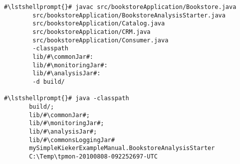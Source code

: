 \begin{lstlisting}[caption=Compile and run under Windows] 			
#\lstshellprompt{}# javac src/bookstoreApplication/Bookstore.java 
        src/bookstoreApplication/BookstoreAnalysisStarter.java 
        src/bookstoreApplication/Catalog.java 
        src/bookstoreApplication/CRM.java 
        src/bookstoreApplication/Consumer.java
        -classpath
        lib/#\commonJar#:
        lib/#\monitoringJar#:
        lib/#\analysisJar#:
        -d build/

#\lstshellprompt{}# java -classpath 
       build/;
       lib/#\commonJar#;
       lib/#\monitoringJar#;
       lib/#\analysisJar#;
       lib/#\commonsLoggingJar#
       mySimpleKiekerExampleManual.BookstoreAnalysisStarter 
       C:\Temp\tpmon-20100808-092252697-UTC
\end{lstlisting}	
